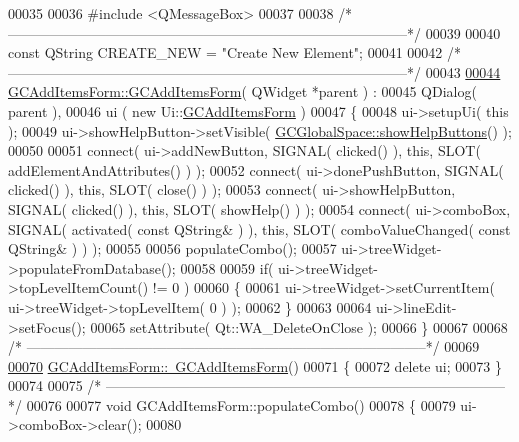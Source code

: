 \begin{DoxyCode}
00035 
00036 \textcolor{preprocessor}{#include <QMessageBox>}
00037 
00038 \textcolor{comment}{/*
      --------------------------------------------------------------------------------------*/}
00039 
00040 \textcolor{keyword}{const} QString CREATE\_NEW = \textcolor{stringliteral}{"Create New Element"};
00041 
00042 \textcolor{comment}{/*
      --------------------------------------------------------------------------------------*/}
00043 
\hypertarget{gcadditemsform_8cpp_source_l00044}{}\hyperlink{class_g_c_add_items_form_adfd8359e3e47a03741efee4e2be3d229}{00044} \hyperlink{class_g_c_add_items_form_adfd8359e3e47a03741efee4e2be3d229}{GCAddItemsForm::GCAddItemsForm}( QWidget *parent ) :
00045   QDialog( parent ),
00046   ui     ( new Ui::\hyperlink{class_g_c_add_items_form}{GCAddItemsForm} )
00047 \{
00048   ui->setupUi( \textcolor{keyword}{this} );
00049   ui->showHelpButton->setVisible( \hyperlink{namespace_g_c_global_space_a981753e55f0f77f981f67ccb1ad4ecf1}{GCGlobalSpace::showHelpButtons}() );
00050 
00051   connect( ui->addNewButton,   SIGNAL( clicked() ), \textcolor{keyword}{this}, SLOT( 
      addElementAndAttributes() ) );
00052   connect( ui->donePushButton, SIGNAL( clicked() ), \textcolor{keyword}{this}, SLOT( close() ) );
00053   connect( ui->showHelpButton, SIGNAL( clicked() ), \textcolor{keyword}{this}, SLOT( showHelp() ) );
00054   connect( ui->comboBox,       SIGNAL( activated( \textcolor{keyword}{const} QString& ) ), \textcolor{keyword}{this}, 
      SLOT( comboValueChanged( \textcolor{keyword}{const} QString& ) ) );
00055 
00056   populateCombo();
00057   ui->treeWidget->populateFromDatabase();
00058 
00059   \textcolor{keywordflow}{if}( ui->treeWidget->topLevelItemCount() != 0 )
00060   \{
00061     ui->treeWidget->setCurrentItem( ui->treeWidget->topLevelItem( 0 ) );
00062   \}
00063 
00064   ui->lineEdit->setFocus();
00065   setAttribute( Qt::WA\_DeleteOnClose );
00066 \}
00067 
00068 \textcolor{comment}{/*
      --------------------------------------------------------------------------------------*/}
00069 
\hypertarget{gcadditemsform_8cpp_source_l00070}{}\hyperlink{class_g_c_add_items_form_adbcd4fa77a2c1c345fd08e2333a45102}{00070} \hyperlink{class_g_c_add_items_form_adbcd4fa77a2c1c345fd08e2333a45102}{GCAddItemsForm::~GCAddItemsForm}()
00071 \{
00072   \textcolor{keyword}{delete} ui;
00073 \}
00074 
00075 \textcolor{comment}{/*
      --------------------------------------------------------------------------------------*/}
00076 
00077 \textcolor{keywordtype}{void} GCAddItemsForm::populateCombo()
00078 \{
00079   ui->comboBox->clear();
00080 

\end{DoxyCode}
